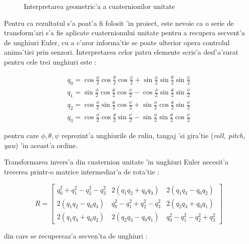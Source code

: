 \documentclass[12pt,a4paper,twoside]{report}
\begin{document}
\begin{figure}[h]
\centering
 
 \caption{Interpretarea geometric'a a cuaternionilor unitate}
\end{figure}

Pentru ca rezultatul s'a poat'a fi folosit 'in proiect, este nevoie ca o serie de transform'ari s'a fie aplicate cuaternionului unitate pentru a recupera secvent'a de unghiuri Euler, cu a c'aror informa'tie se poate ulterior opera controlul anima'tiei prin senzori. Interpretarea celor patru elemente scris'a desf'a'surat pentru cele trei unghiuri este \cite{quat}:

\begin{gather}
    q_0 = \cos{\frac{\phi}{2}} \cos{\frac{\theta}{2}} \cos{\frac{\psi}{2}} + \sin{\frac{\phi}{2}} \sin{\frac{\theta}{2}} \sin{\frac{\psi}{2}} \\
     q_1 = \sin{\frac{\phi}{2}} \cos{\frac{\theta}{2}} \cos{\frac{\psi}{2}} - \cos{\frac{\phi}{2}} \sin{\frac{\theta}{2}} \sin{\frac{\psi}{2}} \\
      q_2 = \cos{\frac{\phi}{2}} \sin{\frac{\theta}{2}} \cos{\frac{\psi}{2}} + \sin{\frac{\phi}{2}} \cos{\frac{\theta}{2}} \sin{\frac{\psi}{2}} \\
       q_3 = \cos{\frac{\phi}{2}} \cos{\frac{\theta}{2}} \sin{\frac{\psi}{2}} - \sin{\frac{\phi}{2}} \sin{\frac{\theta}{2}} \cos{\frac{\psi}{2}}
\end{gather}

pentru care $\phi, \theta, \psi$ reprezint'a unghiurile de ruliu, tangaj 'si gira'tie (\textit{roll, pitch, yaw}) 'in aceast'a ordine. 

\vspace{5px}

Transformarea invers'a din cuaternion unitate 'in unghiuri Euler necesit'a trecerea printr-o matrice intermediar'a de rota'tie \cite{yetagainquats}:

\begin{equation}
    R= \begin{bmatrix}
   q^2_0 + q^2_1 - q^2_2 - q^2_3 & 2(q_1 q_2 + q_0 q_3) & 2(q_1 q_3 - q_0 q_2) \\ 2(q_1 q_2 - q_0 q_3) & q^2_0 - q^2_1 + q^2_2 - q^2_3 & 2(q_2 q_3 + q_0 q_1) \\ 2(q_1 q_3 + q_0 q_2) & 2(q_2 q_3 - q_0 q_1) &  q^2_0 - q^2_1 - q^2_2 + q^2_3
    \end{bmatrix}
\end{equation}

din care se recupereaz'a secven'ta de unghiuri \cite{article3}:
\end{document}

